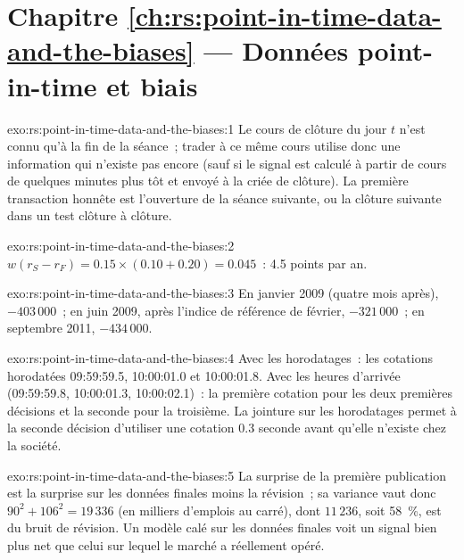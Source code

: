 \section*{Chapitre \ref{ch:rs:point-in-time-data-and-the-biases} --- Données point-in-time et biais}

\begin{solution}{exo:rs:point-in-time-data-and-the-biases:1}
Le cours de clôture du jour $t$ n'est connu qu'à la fin de la séance~; trader à ce même cours utilise donc une information qui n'existe pas encore (sauf si le signal est
calculé à partir de cours de quelques minutes plus tôt et envoyé à la criée de clôture). La première transaction honnête est
l'ouverture de la séance suivante, ou la clôture suivante dans un test clôture à clôture.
\end{solution}

\begin{solution}{exo:rs:point-in-time-data-and-the-biases:2}
$w(r_S - r_F) = 0.15 \times (0.10 + 0.20) = 0.045$~: 4.5 points par an.
\end{solution}

\begin{solution}{exo:rs:point-in-time-data-and-the-biases:3}
En janvier 2009 (quatre mois après), $-403\,000$~; en juin 2009, après l'indice de référence de février, $-321\,000$~; en septembre 2011,
$-434\,000$.
\end{solution}

\begin{solution}{exo:rs:point-in-time-data-and-the-biases:4}
Avec les horodatages~: les cotations horodatées 09:59:59.5, 10:00:01.0 et 10:00:01.8. Avec les heures d'arrivée (09:59:59.8, 10:00:01.3, 10:00:02.1)~: la
première cotation pour les deux premières décisions et la seconde pour la troisième. La jointure sur les horodatages permet à la seconde décision d'utiliser une cotation
0.3 seconde avant qu'elle n'existe chez la société.
\end{solution}

\begin{solution}{exo:rs:point-in-time-data-and-the-biases:5}
La surprise de la première publication est la surprise sur les données finales moins la révision~; sa variance vaut donc $90^2 + 106^2 = 19\,336$ (en
milliers d'emplois au carré), dont $11\,236$, soit 58~\%, est du bruit de révision. Un modèle calé sur les données finales voit un signal bien plus net que celui
sur lequel le marché a réellement opéré.
\end{solution}


